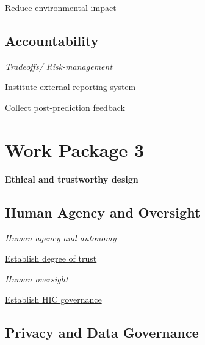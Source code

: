 \documentclass[
  letterpaper,
  DIV=11,
  numbers=noendperiod]{scrreport}
\begin{document}
\protect\hyperlink{reduce-environmental-impact}{Reduce environmental
impact}

\hypertarget{accountability-1}{%
\section*{Accountability}\label{accountability-1}}


\emph{Tradeoffs/ Risk-management}

\protect\hyperlink{institute-external-reporting-system}{Institute
external reporting system}

\protect\hyperlink{collect-post-prediction-feedback}{Collect
post-prediction feedback}


\hypertarget{work-package-3}{%
\chapter*{Work Package 3}\label{work-package-3}}


\textbf{Ethical and trustworthy design}

\hypertarget{human-agency-and-oversight-2}{%
\section*{Human Agency and
Oversight}\label{human-agency-and-oversight-2}}


\emph{Human agency and autonomy}

\protect\hyperlink{establish-degree-of-trust}{Establish degree of trust}

\emph{Human oversight}

\protect\hyperlink{establish-hic-governance}{Establish HIC governance}

\hypertarget{privacy-and-data-governance-3}{%
\section*{Privacy and Data
Governance}\label{privacy-and-data-governance-3}}
\end{document}
